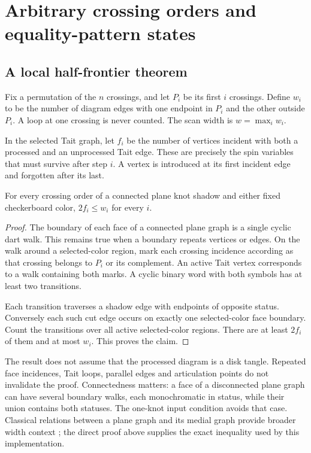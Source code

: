 \section{Arbitrary crossing orders and equality-pattern states}
\label{sec:frontiers}

\subsection{A local half-frontier theorem}

Fix a permutation of the $n$ crossings, and let $P_i$ be its first $i$
crossings. Define $w_i$ to be the number of diagram edges with one endpoint
in $P_i$ and the other outside $P_i$. A loop at one crossing is never counted.
The scan width is $w=\max_i w_i$.

In the selected Tait graph, let $f_i$ be the number of vertices incident with
both a processed and an unprocessed Tait edge. These are precisely the spin
variables that must survive after step $i$. A vertex is introduced at its
first incident edge and forgotten after its last.

\begin{theorem}\label{thm:half}
For every crossing order of a connected plane knot shadow and either fixed
checkerboard color, $2f_i\le w_i$ for every $i$.
\end{theorem}
\begin{proof}
The boundary of each face of a connected plane graph is a single cyclic
dart walk. This remains true when a boundary repeats vertices or edges.
On the walk around a selected-color region, mark each crossing incidence
according as that crossing belongs to $P_i$ or its complement.
An active Tait vertex corresponds to a walk containing both marks.
A cyclic binary word with both symbols has at least two transitions.

Each transition traverses a shadow edge with endpoints of opposite status.
Conversely each such cut edge occurs on exactly one selected-color face
boundary. Count the transitions over all active selected-color regions.
There are at least $2f_i$ of them and at most $w_i$. This proves the claim.
\end{proof}

The result does not assume that the processed diagram is a disk tangle.
Repeated face incidences, Tait loops, parallel edges and articulation points
do not invalidate the proof. Connectedness matters: a face of a disconnected
plane graph can have several boundary walks, each monochromatic in status,
while their union contains both statuses. The one-knot input condition
avoids that case. Classical relations between a plane graph and its medial
graph provide broader width context \cite{seymour1994}; the direct proof
above supplies the exact inequality used by this implementation.

